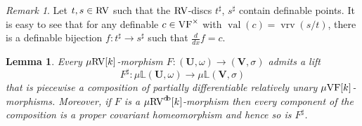 \documentclass[12pt]{amsart}
\theoremstyle{plain}
\newtheorem{lem}[thm]{Lemma}
\theoremstyle{definition}
\theoremstyle{remark}
\newtheorem{rem}[thm]{Remark}
\numberwithin{equation}{section}
\theoremstyle{plain}
\newcommand{\VF}{\textup{VF}}
\newcommand{\RV}{\textup{RV}}
\newcommand{\0}{\emptyset}
\newcommand{\bb}[1]{\mathbb{#1}}
\newcommand{\fun}{\longrightarrow}
\newcommand{\mVF}{{\mu}{\VF}}
\newcommand{\mRV}{{\mu}{\RV}}
\DeclareMathOperator{\vv}{val}
\DeclareMathOperator{\vrv}{vrv}
\DeclareMathOperator{\db}{d \! b}
\newcommand{\ddx}{\tfrac{d}{d x}}
\begin{document}
\begin{rem}\label{rvdisc:stre}
Let $t, s \in \RV$ such that the $\RV$-discs $t^\sharp$, $s^\sharp$ contain definable points. It is easy to see that for any definable $c \in \VF^\times$ with $\vv(c) = \vrv(s/t)$, there is a definable bijection $f : t^\sharp \fun s^\sharp$ such that $\ddx f = c$.
\end{rem}


\begin{lem}\label{L:measure:class:lift}
Every $\mRV[k]$-morphism $F : (\bm U, \omega) \fun (\bm V, \sigma)$ admits a lift
\[
F^\sharp: {\mu}\bb{L}(\bm U, \omega) \fun {\mu}\bb{L}(\bm V, \sigma)
\]
that is piecewise a composition of partially differentiable relatively unary $\mVF[k]$-morphisms. Moreover, if $F$ is a $\mRV^{\db}[k]$-morphism then every component of the composition is a  proper covariant homeomorphism and hence so is $F^\sharp$.
\end{lem}
\end{document}
